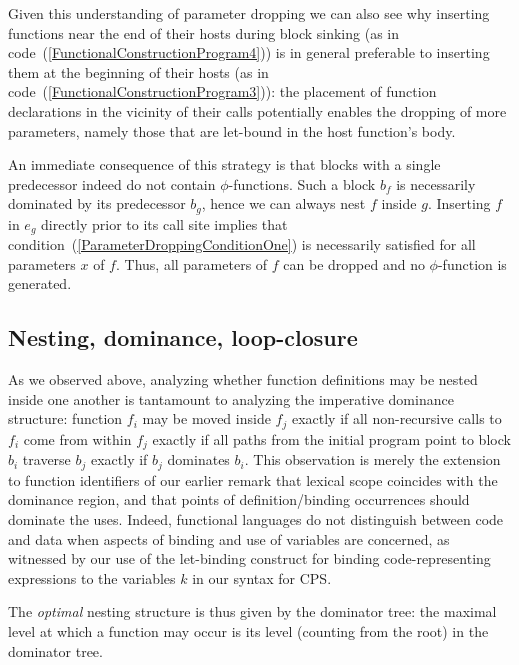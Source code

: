 Given this understanding of parameter dropping we can also see why
inserting functions near the end of their hosts during block sinking
(as in code~(\ref{FunctionalConstructionProgram4})) is in general
preferable to inserting them at the beginning of their hosts (as in
code~(\ref{FunctionalConstructionProgram3})): the placement of
function declarations in the vicinity of their calls potentially
enables the dropping of more parameters, namely those that are
let-bound in the host function's body.

An immediate consequence of this strategy is that blocks with a single
predecessor indeed do not contain $\phi$-functions. Such a block $b_f$
is necessarily dominated by its predecessor $b_g$, hence we can always
nest $f$ inside $g$. Inserting $f$ in $e_g$ directly prior to its call
site implies that condition~(\ref{ParameterDroppingConditionOne}) is
necessarily satisfied for all parameters $x$ of $f$. Thus, all
parameters of $f$ can be dropped and no $\phi$-function is generated.

\subsection{Nesting, dominance, loop-closure}
\label{section:semantics:loopclosure}
As we observed above, analyzing whether function definitions may be
nested inside one another is tantamount to analyzing the imperative
dominance structure: function $f_i$ may be moved inside $f_j$ exactly
if all non-recursive calls to $f_i$ come from within $f_j$ exactly if
all paths from the initial program point to block $b_i$ traverse $b_j$
exactly if $b_j$ dominates $b_i$.  This observation is merely the
extension to function identifiers of our earlier remark that lexical
scope coincides with the dominance region, and that points of
definition/binding occurrences should dominate the uses. Indeed,
functional languages do not distinguish between code and data when
aspects of binding and use of variables are concerned, as witnessed by
our use of the let-binding construct for binding code-representing
expressions to the variables $k$ in our syntax for CPS.

The \emph{optimal} nesting structure is thus given by the dominator
tree: the maximal level at which a function may occur is its level
(counting from the root) in the dominator tree.

